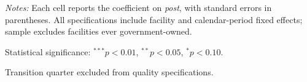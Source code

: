 \documentclass[11pt]{article}
\begin{document}
\begin{table}[!ht]
\begin{threeparttable}
\begin{tablenotes}[flushleft]
\footnotesize
\item \textit{Notes:} Each cell reports the coefficient on \textit{post}, with standard errors in parentheses. All specifications include facility and calendar-period fixed effects; sample excludes facilities ever government-owned.
\item Statistical significance: $^{***}p<0.01$, $^{**}p<0.05$, $^{*}p<0.10$.
\item Transition quarter excluded from quality specifications.
\end{tablenotes}
\end{threeparttable}
\end{table}
\end{document}
